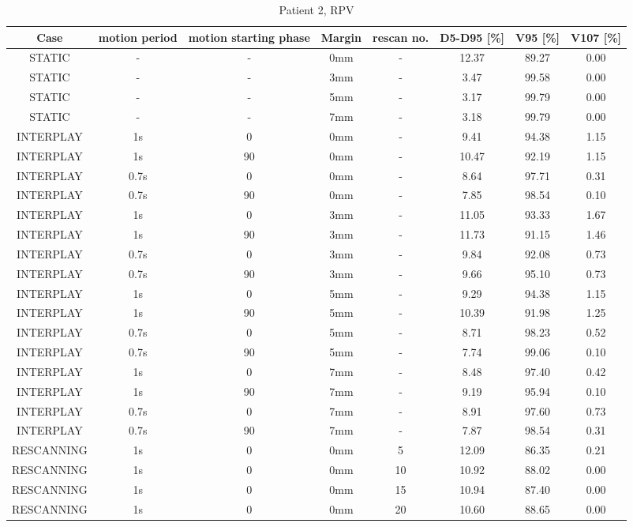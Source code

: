 \begin{table}[H]
  \centering
  \tiny
  \caption{Patient 2, RPV}
  \begin{tabular}{|c||c|c|c|c||c|c|c|}
    \hline\hline
    Case & motion period & motion starting phase & Margin & rescan no. & D5-D95 [\%] & V95 [\%] & V107 [\%] \\
    \hline 
STATIC & - & - & 0mm & - & 12.37 & 89.27 & 0.00 \\
STATIC & - & - & 3mm & - & 3.47 & 99.58 & 0.00 \\
STATIC & - & - & 5mm & - & 3.17 & 99.79 & 0.00 \\
STATIC & - & - & 7mm & - & 3.18 & 99.79 & 0.00 \\
INTERPLAY & 1s & 0 & 0mm & - & 9.41 & 94.38 & 1.15 \\
INTERPLAY & 1s & 90 & 0mm & - & 10.47 & 92.19 & 1.15 \\
INTERPLAY & 0.7s & 0 & 0mm & - & 8.64 & 97.71 & 0.31 \\
INTERPLAY & 0.7s & 90 & 0mm & - & 7.85 & 98.54 & 0.10 \\
INTERPLAY & 1s & 0 & 3mm & - & 11.05 & 93.33 & 1.67 \\
INTERPLAY & 1s & 90 & 3mm & - & 11.73 & 91.15 & 1.46 \\
INTERPLAY & 0.7s & 0 & 3mm & - & 9.84 & 92.08 & 0.73 \\
INTERPLAY & 0.7s & 90 & 3mm & - & 9.66 & 95.10 & 0.73 \\
INTERPLAY & 1s & 0 & 5mm & - & 9.29 & 94.38 & 1.15 \\
INTERPLAY & 1s & 90 & 5mm & - & 10.39 & 91.98 & 1.25 \\
INTERPLAY & 0.7s & 0 & 5mm & - & 8.71 & 98.23 & 0.52 \\
INTERPLAY & 0.7s & 90 & 5mm & - & 7.74 & 99.06 & 0.10 \\
INTERPLAY & 1s & 0 & 7mm & - & 8.48 & 97.40 & 0.42 \\
INTERPLAY & 1s & 90 & 7mm & - & 9.19 & 95.94 & 0.10 \\
INTERPLAY & 0.7s & 0 & 7mm & - & 8.91 & 97.60 & 0.73 \\
INTERPLAY & 0.7s & 90 & 7mm & - & 7.87 & 98.54 & 0.31 \\
RESCANNING & 1s & 0 & 0mm & 5 & 12.09 & 86.35 & 0.21 \\
RESCANNING & 1s & 0 & 0mm & 10 & 10.92 & 88.02 & 0.00 \\
RESCANNING & 1s & 0 & 0mm & 15 & 10.94 & 87.40 & 0.00 \\
RESCANNING & 1s & 0 & 0mm & 20 & 10.60 & 88.65 & 0.00 \\

\end{tabular}
\end{table}
